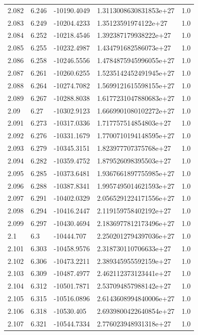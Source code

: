 \begin{tabular}{lllll}
2.082 & 6.246 & -10190.4049 & 1.3113008630831853e+27 & 1.0 \\
2.083 & 6.249 & -10204.4233 & 1.35123591974122e+27 & 1.0 \\
2.084 & 6.252 & -10218.4546 & 1.392387179938222e+27 & 1.0 \\
2.085 & 6.255 & -10232.4987 & 1.434791682586073e+27 & 1.0 \\
2.086 & 6.258 & -10246.5556 & 1.4784875945996055e+27 & 1.0 \\
2.087 & 6.261 & -10260.6255 & 1.5235142452491945e+27 & 1.0 \\
2.088 & 6.264 & -10274.7082 & 1.5699121615598155e+27 & 1.0 \\
2.089 & 6.267 & -10288.8038 & 1.6177231047880683e+27 & 1.0 \\
2.09 & 6.27 & -10302.9123 & 1.6669901080102272e+27 & 1.0 \\
2.091 & 6.273 & -10317.0336 & 1.717757514854803e+27 & 1.0 \\
2.092 & 6.276 & -10331.1679 & 1.7700710194148595e+27 & 1.0 \\
2.093 & 6.279 & -10345.3151 & 1.823977707375768e+27 & 1.0 \\
2.094 & 6.282 & -10359.4752 & 1.879526098395503e+27 & 1.0 \\
2.095 & 6.285 & -10373.6481 & 1.9367661897755985e+27 & 1.0 \\
2.096 & 6.288 & -10387.8341 & 1.9957495014621593e+27 & 1.0 \\
2.097 & 6.291 & -10402.0329 & 2.0565291224171556e+27 & 1.0 \\
2.098 & 6.294 & -10416.2447 & 2.119159758402192e+27 & 1.0 \\
2.099 & 6.297 & -10430.4694 & 2.1836977812173496e+27 & 1.0 \\
2.1 & 6.3 & -10444.707 & 2.2502012794397036e+27 & 1.0 \\
2.101 & 6.303 & -10458.9576 & 2.318730110706633e+27 & 1.0 \\
2.102 & 6.306 & -10473.2211 & 2.389345955592159e+27 & 1.0 \\
2.103 & 6.309 & -10487.4977 & 2.462112373123441e+27 & 1.0 \\
2.104 & 6.312 & -10501.7871 & 2.537094857988142e+27 & 1.0 \\
2.105 & 6.315 & -10516.0896 & 2.6143608994840006e+27 & 1.0 \\
2.106 & 6.318 & -10530.405 & 2.6939800422640854e+27 & 1.0 \\
2.107 & 6.321 & -10544.7334 & 2.776023948931318e+27 & 1.0 \\

\end{tabular}
